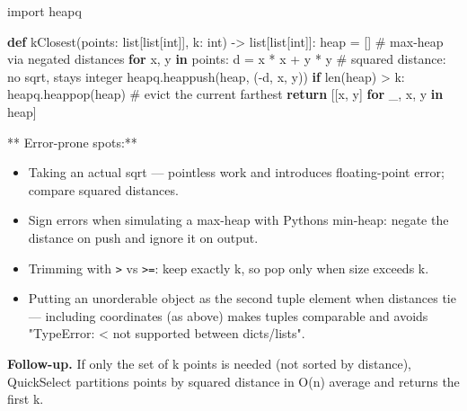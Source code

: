 \documentclass[11pt]{article}
\providecommand{\tightlist}{\setlength{\itemsep}{1pt}\setlength{\parskip}{0pt}}
\newenvironment{Shaded}{\begin{snugshade}}{\end{snugshade}}
\newcommand{\BuiltInTok}[1]{\textcolor[rgb]{0.50,0.55,0.55}{#1}}
\newcommand{\CommentTok}[1]{\textcolor[rgb]{0.48,0.49,0.49}{#1}}
\newcommand{\ControlFlowTok}[1]{\textcolor[rgb]{0.99,0.74,0.29}{\textbf{#1}}}
\newcommand{\ImportTok}[1]{\textcolor[rgb]{0.15,0.68,0.38}{#1}}
\newcommand{\KeywordTok}[1]{\textcolor[rgb]{0.81,0.81,0.76}{\textbf{#1}}}
\newcommand{\NormalTok}[1]{\textcolor[rgb]{0.81,0.81,0.76}{#1}}
\newcommand{\OperatorTok}[1]{\textcolor[rgb]{0.81,0.81,0.76}{#1}}
\begin{document}
\begin{Shaded}
\begin{Highlighting}[]
\ImportTok{import}\NormalTok{ heapq}

\KeywordTok{def}\NormalTok{ kClosest(points: }\BuiltInTok{list}\NormalTok{[}\BuiltInTok{list}\NormalTok{[}\BuiltInTok{int}\NormalTok{]], k: }\BuiltInTok{int}\NormalTok{) }\OperatorTok{{-}\textgreater{}} \BuiltInTok{list}\NormalTok{[}\BuiltInTok{list}\NormalTok{[}\BuiltInTok{int}\NormalTok{]]:}
\NormalTok{    heap }\OperatorTok{=}\NormalTok{ []                      }\CommentTok{\# max{-}heap via negated distances}
    \ControlFlowTok{for}\NormalTok{ x, y }\KeywordTok{in}\NormalTok{ points:}
\NormalTok{        d }\OperatorTok{=}\NormalTok{ x }\OperatorTok{*}\NormalTok{ x }\OperatorTok{+}\NormalTok{ y }\OperatorTok{*}\NormalTok{ y          }\CommentTok{\# squared distance: no sqrt, stays integer}
\NormalTok{        heapq.heappush(heap, (}\OperatorTok{{-}}\NormalTok{d, x, y))}
        \ControlFlowTok{if} \BuiltInTok{len}\NormalTok{(heap) }\OperatorTok{\textgreater{}}\NormalTok{ k:}
\NormalTok{            heapq.heappop(heap)    }\CommentTok{\# evict the current farthest}
    \ControlFlowTok{return}\NormalTok{ [[x, y] }\ControlFlowTok{for}\NormalTok{ \_, x, y }\KeywordTok{in}\NormalTok{ heap]}
\end{Highlighting}
\end{Shaded}

** Error-prone spots:**

\begin{itemize}
\tightlist
\item
  Taking an actual sqrt --- pointless work and introduces floating-point error; compare squared distances.
\item
  Sign errors when simulating a max-heap with Python\textquotesingle s min-heap: negate the distance on push and ignore it on output.
\item
  Trimming with \texttt{\textgreater{}} vs \texttt{\textgreater{}=}: keep exactly k, so pop only when size exceeds k.
\item
  Putting an unorderable object as the second tuple element when distances tie --- including coordinates (as above) makes tuples comparable and avoids "TypeError: \textless{} not supported between dicts/lists".
\end{itemize}

\textbf{Follow-up.} If only the set of k points is needed (not sorted by distance), QuickSelect partitions points by squared distance in O(n) average and returns the first k.
\end{document}

